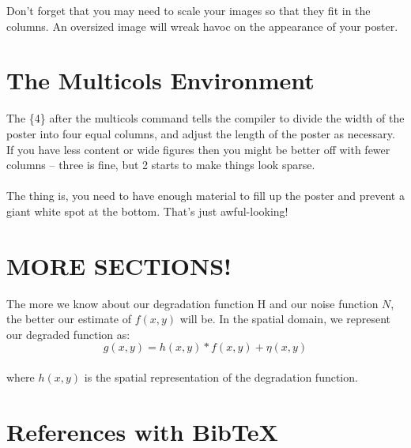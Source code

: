 \documentclass[landscape]{sciposter}
\begin{document}
\begin{multicols}{4}
Don't forget that you may need to scale your images so that they fit in the columns.  An oversized image will wreak havoc on the appearance of your poster.


\section{The Multicols Environment}

The \{4\} after the multicols command tells the compiler to divide the width of the poster into four equal columns, and adjust the length of the poster as necessary.  If you have less content or wide figures then you might be better off with fewer columns -- three is fine, but 2 starts to make things look sparse.
\\
\\
The thing is, you need to have enough material to fill up the poster and prevent a giant white spot at the bottom.  That's just awful-looking!


\section{MORE SECTIONS!}

The more we know about our degradation function H and our noise function $N$, the better our estimate of $f(x,y)$ will be. In the spatial domain, we represent our degraded function as: 
\\
\begin{equation}
g(x,y)=h(x,y) \ast f(x,y) + \eta(x,y)
\label{eq:conv}
\end{equation}
\\
where $h(x,y)$ is the spatial representation of the degradation function. 

\section{References with BibTeX}


\end{multicols}
\end{document}

